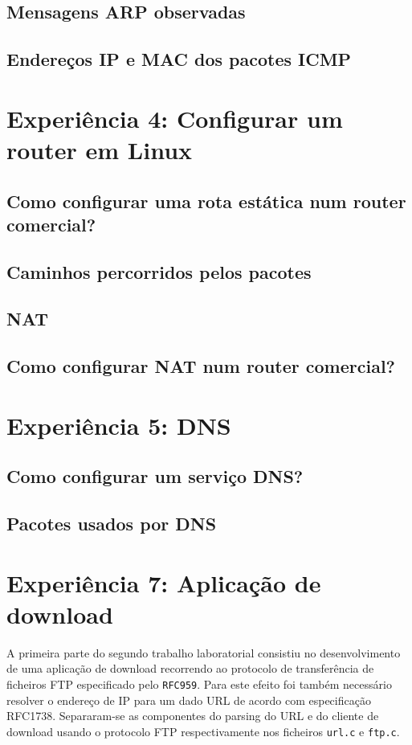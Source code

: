 \documentclass[a4paper,11pt,titlepage]{article}
\begin{document}
\subsection{Mensagens ARP observadas}

\subsection{Endereços IP e MAC dos pacotes ICMP}

\section{Experiência 4: Configurar um router em Linux }

\subsection{Como configurar uma rota estática num router comercial?}

\subsection{Caminhos percorridos pelos pacotes}

\subsection{NAT}

\subsection{Como configurar NAT num router comercial?}

\section{Experiência 5: DNS }

\subsection{Como configurar um serviço DNS?}

\subsection{Pacotes usados por DNS}

\section{Experiência 7: Aplicação de download}
A primeira parte do segundo trabalho laboratorial consistiu no desenvolvimento
de uma aplicação de download recorrendo ao protocolo de transferência de
ficheiros FTP especificado pelo \texttt{RFC959}. Para este efeito foi também
necessário resolver o endereço de IP para um dado URL de acordo com
especificação RFC1738. Separaram-se as componentes do parsing do URL e do
cliente de download usando o protocolo FTP respectivamente nos ficheiros
\texttt{url.c} e \texttt{ftp.c}.
\end{document}
